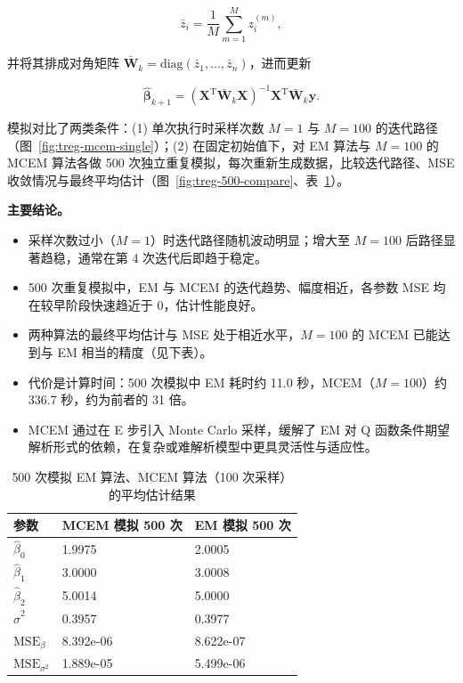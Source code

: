 \documentclass[12pt,a4paper]{ctexart}
\numberwithin{figure}{section}
\numberwithin{table}{section}
\begin{document}
\begin{equation*}
\bar z_i = \frac{1}{M}\sum_{m=1}^{M} z_i^{(m)},
\end{equation*}

并将其排成对角矩阵 $\bar{\boldsymbol{W}}_k=\mathrm{diag}(\bar z_1,\dots,\bar z_n)$，进而更新

\begin{equation*}
\hat{\boldsymbol{\beta}}_{k+1}=(\boldsymbol{X}^{\mathrm{T}}\bar{\boldsymbol{W}}_k\boldsymbol{X})^{-1}\boldsymbol{X}^{\mathrm{T}}\bar{\boldsymbol{W}}_k\boldsymbol{y}.
\end{equation*}

模拟对比了两类条件：(1) 单次执行时采样次数 $M=1$ 与 $M=100$ 的迭代路径（图~\ref{fig:treg-mcem-single}）；(2) 在固定初始值下，对 EM 算法与 $M=100$ 的 MCEM 算法各做 500 次独立重复模拟，每次重新生成数据，比较迭代路径、MSE 收敛情况与最终平均估计（图~\ref{fig:treg-500-compare}、表~\ref{tab:treg-500}）。

\textbf{主要结论。}

\begin{itemize}
  \item 采样次数过小（$M=1$）时迭代路径随机波动明显；增大至 $M=100$ 后路径显著趋稳，通常在第 4 次迭代后即趋于稳定。
  \item 500 次重复模拟中，EM 与 MCEM 的迭代趋势、幅度相近，各参数 MSE 均在较早阶段快速趋近于 0，估计性能良好。
  \item 两种算法的最终平均估计与 MSE 处于相近水平，$M=100$ 的 MCEM 已能达到与 EM 相当的精度（见下表）。
  \item 代价是计算时间：500 次模拟中 EM 耗时约 11.0 秒，MCEM（$M=100$）约 336.7 秒，约为前者的 31 倍。
  \item MCEM 通过在 E 步引入 Monte Carlo 采样，缓解了 EM 对 Q 函数条件期望解析形式的依赖，在复杂或难解析模型中更具灵活性与适应性。
\end{itemize}

\begin{table}[H]
\centering
\caption{500 次模拟 EM 算法、MCEM 算法（100 次采样）的平均估计结果}
\label{tab:treg-500}
\begin{tabular}{lll}
\toprule
参数 & MCEM 模拟 500 次 & EM 模拟 500 次 \\
\midrule
$\hat\beta_0$ & 1.9975 & 2.0005 \\
$\hat\beta_1$ & 3.0000 & 3.0008 \\
$\hat\beta_2$ & 5.0014 & 5.0000 \\
$\hat\sigma^2$ & 0.3957 & 0.3977 \\
$\mathrm{MSE}_{\beta}$ & 8.392e-06 & 8.622e-07 \\
$\mathrm{MSE}_{\sigma^2}$ & 1.889e-05 & 5.499e-06 \\
\bottomrule
\end{tabular}
\end{table}
\end{document}
